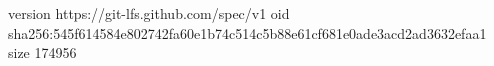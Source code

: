 version https://git-lfs.github.com/spec/v1
oid sha256:545f614584e802742fa60e1b74c514c5b88e61cf681e0ade3acd2ad3632efaa1
size 174956

